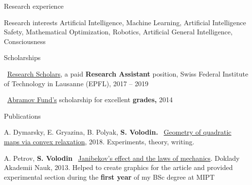 \documentclass{resume} %
\newcommand{\mylink}{{\color{gray}\faExternalLink}}
\begin{document}
\begin{rSection}{Research experience}
\end{rSection}

\begin{rSection}{Research interests}
	Artificial Intelligence, Machine Learning, Artificial Intelligence Safety, Mathematical Optimization, Robotics, Artificial General Intelligence, Consciousness
\end{rSection}

\begin{rSection}{Scholarships}
	\vspace{-1em}
	\item \mylink~\href{https://ic.epfl.ch/ResearchScholars}{Research Scholars}, a paid {\bf Research Assistant} position, Swiss Federal Institute of Technology in Lausanne (EPFL), 2017 -- 2019
	\item \mylink~\href{http://phystech-foundation.org/}{Abramov Fund's} scholarship for excellent {\bf grades,} 2014
\end{rSection}

\newpage

\begin{rSection}{Publications}
\vspace{-1em}
\item A. Dymarsky, E. Gryazina, B. Polyak, {\bf \color{grayheading} S. Volodin.} \mylink~\href{https://arxiv.org/pdf/1810.00896.pdf}{Geometry of quadratic maps via convex relaxation}, 2018. Experiments, theory, writing.%
\item A. Petrov, {\bf \color{grayheading} S. Volodin} \mylink~\href{https://link.springer.com/article/10.1134/S1028335813080041}{Janibekov's effect and the laws of mechanics}. Doklady Akademii Nauk, 2013. Helped to create graphics for the article and provided experimental section during the {\bf first year} of my BSc degree at MIPT
\end{rSection}
\end{document}
